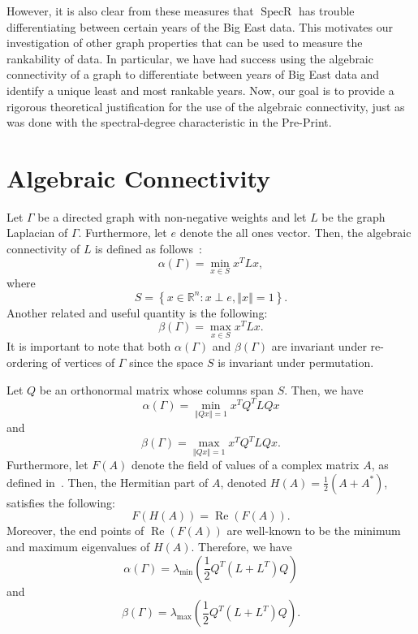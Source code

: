 \documentclass{article}
\newcommand\norm[1]{\left\Vert#1\right\Vert}
\newcommand\re[1]{\operatorname{Re}\left(#1\right)}
\DeclareMathOperator{\specr}{SpecR}
\begin{document}
However, it is also clear from these measures that $\specr$ has trouble differentiating between certain years of the Big East data. 
This motivates our investigation of other graph properties that can be used to measure the rankability of data. 
In particular, we have had success using the algebraic connectivity of a graph to differentiate between years of Big East data and identify a unique least and most rankable years.
Now, our goal is to provide a rigorous theoretical justification for the use of the algebraic connectivity, just as was done with the spectral-degree characteristic in the Pre-Print. 

\section{Algebraic Connectivity}	
Let $\Gamma$ be a directed graph with non-negative weights and let $L$ be the graph Laplacian of $\Gamma$. 
Furthermore, let $e$ denote the all ones vector. 
Then, the algebraic connectivity of $L$ is defined as follows~\cite{Wu2005-1}:
\[
\alpha(\Gamma)=\min_{x\in S}x^{T}Lx,
\]
where
\[
S=\left\{x\in\mathbb{R}^{n}\colon x\perp e,\norm{x}=1\right\}.
\]
Another related and useful quantity is the following:
\[
\beta(\Gamma)=\max_{x\in S}x^{T}Lx.
\]
It is important to note that both $\alpha(\Gamma)$ and $\beta(\Gamma)$ are invariant under re-ordering of vertices of $\Gamma$ since the space $S$ is invariant under permutation. 

Let $Q$ be an orthonormal matrix whose columns span $S$.
Then, we have
\[
\alpha(\Gamma)=\min_{\norm{Qx}=1}x^{T}Q^{T}LQx
\]
and
\[
\beta(\Gamma)=\max_{\norm{Qx}=1}x^{T}Q^{T}LQx.
\]
Furthermore, let $F(A)$ denote the field of values of a complex matrix $A$, as defined in~\cite{Horn1991}.
Then, the Hermitian part of $A$, denoted $H(A)=\frac{1}{2}(A+A^{*})$, satisfies the following:
\[
F(H(A))=\re{F(A)}.
\]
Moreover, the end points of $\re{F(A)}$ are well-known to be the minimum and maximum eigenvalues of $H(A)$. 
Therefore, we have
\[
\alpha(\Gamma)=\lambda_{\text{min}}\left(\frac{1}{2}Q^{T}(L+L^{T})Q\right)
\]
and
\[
\beta(\Gamma)=\lambda_{\text{max}}\left(\frac{1}{2}Q^{T}(L+L^{T})Q\right).
\]

\end{document}
